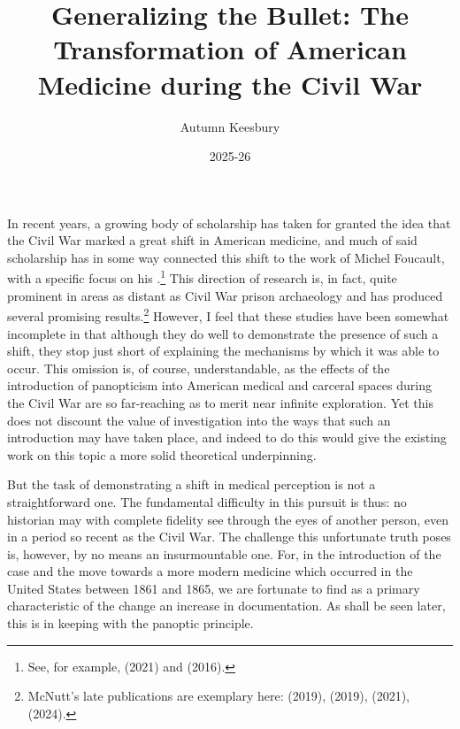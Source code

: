 \documentclass[12pt]{article}
\title{Generalizing the Bullet: The Transformation of American Medicine during the Civil War}
\author{Autumn Keesbury}
\date{2025-26}
\begin{document}
\newcommand{\thesec}

\maketitle
\thispagestyle{firststyle}
\pagestyle{fancy}
\fancyhf{}
\fancyhead[L]{\thesec}


\renewcommand{\thesec}{Introduction}
In recent years, a growing body of scholarship has taken for granted the idea that the Civil War marked a great shift in American medicine, and much
of said scholarship has in some way connected this shift to the work of Michel Foucault, with a specific focus on his .\autocite{Foucault1995}\hspace{1pt}\footnote{See, for example, \citeauthor{Wilson2021} (2021) and \citeauthor{Devine2016} (2016).}
This direction of research is, in fact, quite prominent in areas as distant as Civil War prison archaeology and has produced several promising results.\footnote{McNutt's late publications are exemplary here:  (2019),  (2019),  (2021),  (2024).} However, I feel that these studies have been somewhat incomplete in that although they
do well to demonstrate the presence of such a shift, they stop just short of explaining the mechanisms by which it was able to occur. This omission is, of
course, understandable, as the effects of the introduction of panopticism into American medical and carceral spaces during the Civil War are so far-reaching
as to merit near infinite exploration. Yet this does not discount the value of investigation into the ways that such an introduction may have taken place,
and indeed to do this would give the existing work on this topic a more solid theoretical underpinning.

But the task of demonstrating a shift in medical perception is not a straightforward one. The fundamental difficulty in this pursuit is thus: no historian
may with complete fidelity see through the eyes of another person, even in a period so recent as the Civil War. The challenge this unfortunate truth poses
is, however, by no means an insurmountable one. For, in the introduction of the case and the move towards a more modern medicine which occurred
in the United States between 1861 and 1865, we are fortunate to find as a primary characteristic of the change an increase in documentation. As shall
be seen later, this is in keeping with the panoptic principle.
\end{document}
